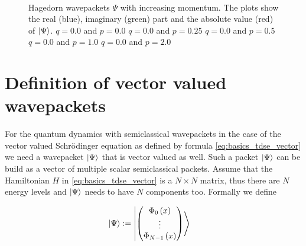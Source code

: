 \begin{figure}
{  } \\
  \caption[Hagedorn wavepackets $\Psi$ with increasing momentum]{
    Hagedorn wavepackets $\Psi$ with increasing momentum. The plots show the real (blue),
    imaginary (green) part and the absolute value (red) of $\Ket{\Psi}$.
        $q = 0.0$ and $p = 0.0$
     $q = 0.0$ and $p = 0.25$
      $q = 0.0$ and $p = 0.5$
        $q = 0.0$ and $p = 1.0$
        $q = 0.0$ and $p = 2.0$
    \label{fig:hawp_impulse}
  }
\end{figure}

\section{Definition of vector valued wavepackets}

For the quantum dynamics with semiclassical wavepackets in the case of the vector
valued Schrödinger equation as defined by formula \eqref{eq:basics_tdse_vector} we
need a wavepacket $\Ket{\Psi}$ that is vector valued as well. Such a packet
$\Ket{\Psi}$ can be build as a vector of multiple scalar semiclassical packets. Assume
that the Hamiltonian $H$ in \eqref{eq:basics_tdse_vector} is a $N \times N$ matrix,
thus there are $N$ energy levels and $\Ket{\Psi}$ needs to have $N$ components
too. Formally we define

\begin{align} \label{eq:hawp_def_state_vector}
  \Ket{\Psi} & := \Ket{ \begin{pmatrix}
                         \Phi_0\left( x \right) \\
                         \vdots \\
                         \Phi_{N-1}\left( x \right) \\
                       \end{pmatrix}}
\end{align}

